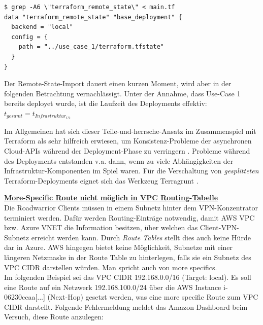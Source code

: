 \begin{lstlisting}[label=tf-remote-state-import,caption=.]
$ grep -A6 \"terraform_remote_state\" < main.tf
data "terraform_remote_state" "base_deployment" {
  backend = "local"
  config = {
    path = "../use_case_1/terraform.tfstate"
  }
}
\end{lstlisting}

Der Remote-State-Import dauert einen kurzen Moment, wird aber in der folgenden Betrachtung vernachlässigt.
Unter der Annahme, dass Use-Case 1 bereits deployet wurde, ist die Laufzeit des Deployments effektiv:\\
$t_{gesamt} = t_{Infrastruktur_{U2}}$

Im Allgemeinen hat sich dieser \glqq Teile-und-herrsche\grqq{}-Ansatz im Zusammenspiel mit Terraform als sehr hilfreich erwiesen, um Konsistenz-Probleme der asynchronen Cloud-APIs während der Deployment-Phase zu verringern \cite[S.183-184]{Brikman2019}. Probleme während des Deployments entstanden v.a. dann, wenn \glqq zu viele\grqq{} Abhängigkeiten der Infrastruktur-Komponenten im Spiel waren. Für die Verschaltung von \textit{gesplitteten} Terraform-Deployments eignet sich das Werkzeug Terragrunt \cite[S.98]{Brikman2019}.

\textbf{\underline{More-Specific Route nicht möglich in VPC Routing-Tabelle}}\\
Die Roadwarrior Clients müssen in einem Subnetz \glqq hinter\grqq{} dem VPN-Konzentrator terminiert werden. Dafür werden Routing-Einträge notwendig, damit AWS VPC bzw. Azure VNET die Information besitzen, über welchen  das Client-VPN-Subnetz erreicht werden kann. Durch \textit{Route Tables} stellt dies auch keine Hürde dar in Azure. AWS hingegen bietet keine Möglichkeit, Subnetze mit einer längeren Netzmaske in der Route Table zu hinterlegen, falls sie ein Subnetz des VPC CIDR darstellen würden. Man spricht auch von \glqq more specifics\grqq{}.\\
Im folgenden Beispiel sei das VPC CIDR 192.168.0.0/16 (Target: local). Es soll eine Route auf ein Netzwerk 192.168.100.0/24 über die AWS Instance \glqq i-06230ccaa[...]\grqq{} (Next-Hop) gesetzt werden, was eine more specific Route zum VPC CIDR darstellt.
Folgende Fehlermeldung meldet das Amazon Dashboard beim Versuch, diese Route anzulegen:

